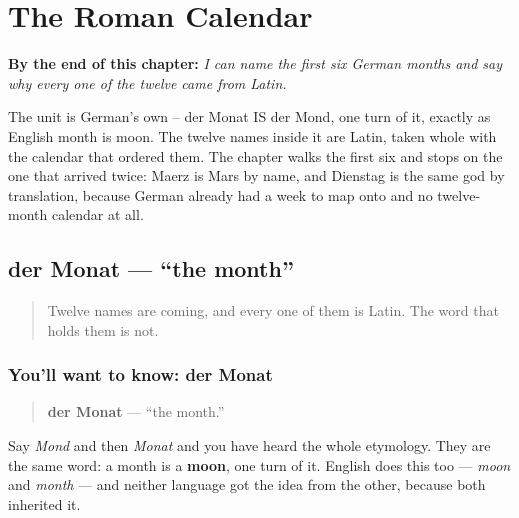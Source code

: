 
\chapter{The Roman Calendar}
\label{ch:monate-roemisch}

\begin{chapteropening}
\textbf{By the end of this chapter:} \emph{I can name the first six German months and say why every one of the twelve came from Latin.}

The unit is German's own -- der Monat IS der Mond, one turn of it, exactly as English month is moon. The twelve names inside it are Latin, taken whole with the calendar that ordered them. The chapter walks the first six and stops on the one that arrived twice: Maerz is Mars by name, and Dienstag is the same god by translation, because German already had a week to map onto and no twelve-month calendar at all.
\end{chapteropening}

\section[der Monat]{der Monat — \textquotedblleft{}the month\textquotedblright{}}

\label{lesson:GE-C09-monate}



\begin{quote}
Twelve names are coming, and every one of them is Latin. The word that holds them is not.
\end{quote}

\subsection*{You'll want to know: der Monat}
\begin{quote}
\textbf{der Monat} — \textquotedblleft{}the month.\textquotedblright{}
\end{quote}

Say \emph{Mond} and then \emph{Monat} and you have heard the whole etymology. They are the same word: a month is a \textbf{moon}, one turn of it. English does this too — \emph{moon} and \emph{month} — and neither language got the idea from the other, because both inherited it.

